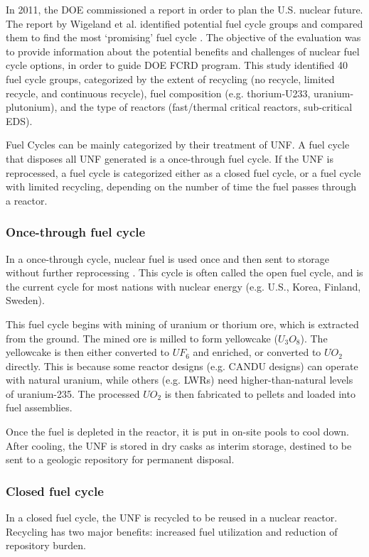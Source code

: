 In 2011, the \gls{DOE} commissioned a report
in order to plan the U.S. nuclear future.
The report by Wigeland et al. identified potential fuel cycle groups and compared them
to find the most `promising' fuel cycle \cite{wigeland_nuclear_2014}.
The objective of the evaluation was to provide information about the
potential benefits and challenges of nuclear fuel cycle options, in order to
guide \gls{DOE} \gls{FCRD} program.
This study identified 40 fuel cycle groups, categorized by the extent of recycling
(no recycle, limited recycle, and continuous recycle), fuel composition
(e.g. thorium-U233, uranium-plutonium), and the type of reactors (fast/thermal critical
reactors, sub-critical \gls{EDS}).

Fuel Cycles can be mainly categorized by their treatment of \gls{UNF}. A
fuel cycle that disposes all \gls{UNF} generated is a once-through fuel cycle.
If the \gls{UNF} is reprocessed, a fuel cycle is categorized either as a
closed fuel cycle, or a fuel cycle with limited recycling, depending on
the number of time the fuel passes through a reactor.


\subsubsection{Once-through fuel cycle}

In a once-through cycle, nuclear fuel is used once and then sent to
storage without further reprocessing \cite{tsoulfanidis_nuclear_2013}.
This cycle is often called the open fuel cycle, and is the current cycle for
most nations with nuclear energy (e.g. U.S., Korea, Finland, Sweden).

This fuel cycle begins with mining of uranium or thorium ore, which is extracted from the
ground. The mined ore is milled to form yellowcake ($U_3O_8$).
The yellowcake is then either converted to $UF_6$ and enriched, or converted
to $UO_2$ directly. This is because some reactor designs (e.g. \gls{CANDU} designs\cite{torgerson_candu_2006})
can operate with natural uranium, while others (e.g. \glspl{LWR}) need
higher-than-natural levels of uranium-235. The processed $UO_2$ is
then fabricated to pellets and loaded into fuel assemblies.

Once the fuel is depleted in the reactor, it is put in on-site pools to cool down.
After cooling, the \gls{UNF}
is stored in dry casks as interim storage, destined to be sent to a geologic repository
for permanent disposal.

\subsubsection{Closed fuel cycle}
In a closed fuel cycle, the \gls{UNF} is recycled to be reused
in a nuclear reactor. Recycling has two major
benefits: increased fuel utilization and reduction of repository
burden.


